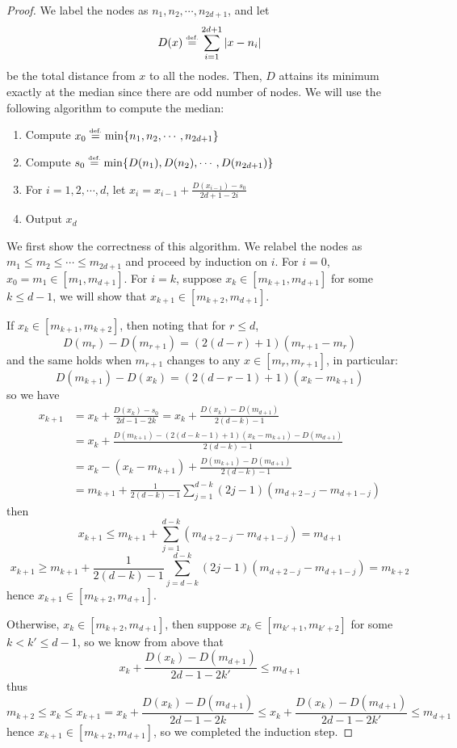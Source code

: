 \documentclass{article}
\numberwithin{equation}{section}
\theoremstyle{definition}
\newcommand{\eqdef}{\ensuremath{\stackrel{\mbox{\upshape\tiny def.}}{=}}}
\begin{document}
\begin{proof}
We label the nodes as $n_1,n_2,\cdots,n_{2d+1}$, and let 
$$D(x) \eqdef \sum_{i=1}^{2d+1} |x-n_i|$$
be the total distance from $x$ to all the nodes. Then, $D$ attains its minimum exactly at the median since there are odd number of nodes. We will use the following algorithm to compute the median:
\begin{enumerate}
    \item Compute $x_0 \eqdef \min\{n_1,n_2,\cdots,n_{2d+1}\}$
    \item Compute $s_0 \eqdef \min\{D(n_1),D(n_2),\cdots,D(n_{2d+1})\}$
    \item For $i=1,2,\cdots,d$, let $\displaystyle x_i=x_{i-1}+\frac{D(x_{i-1})-s_0}{2d+1-2i}$
    \item Output $x_d$
\end{enumerate}

We first show the correctness of this algorithm. We relabel the nodes as $m_1\le m_2\le\cdots\le m_{2d+1}$ and proceed by induction on $i$. For $i=0$, $x_0=m_1\in [m_1,m_{d+1}]$. For $i=k$, suppose $x_k\in [m_{k+1},m_{d+1}]$ for some $k\le d-1$, we will show that $x_{k+1}\in [m_{k+2},m_{d+1}]$.

If $x_k\in [m_{k+1},m_{k+2}]$, then noting that for $r\le d$, 
$$D(m_r)-D(m_{r+1})=(2(d-r)+1)(m_{r+1}-m_r)$$
and the same holds when $m_{r+1}$ changes to any $x\in [m_{r},m_{r+1}]$, in particular:
$$D(m_{k+1})-D(x_k)=(2(d-r-1)+1)(x_k-m_{k+1})$$
so we have
\begin{align*}
    x_{k+1} &= x_k+\frac{D(x_k)-s_0}{2d-1-2k} = x_k+\frac{D(x_k)-D(m_{d+1})}{2(d-k)-1} \\
    &= x_k+\frac{D(m_{k+1})-(2(d-k-1)+1)(x_k-m_{k+1})-D(m_{d+1})}{2(d-k)-1} \\
    &= x_k-(x_k-m_{k+1})+\frac{D(m_{k+1})-D(m_{d+1})}{2(d-k)-1} \\
    &= m_{k+1}+\frac{1}{2(d-k)-1} \sum_{j=1}^{d-k} (2j-1)(m_{d+2-j}-m_{d+1-j})
\end{align*}
then 
$$x_{k+1} \le m_{k+1} + \sum_{j=1}^{d-k} (m_{d+2-j}-m_{d+1-j}) = m_{d+1}$$
$$x_{k+1} \ge m_{k+1} + \frac{1}{2(d-k)-1} \sum_{j=d-k}^{d-k} (2j-1)(m_{d+2-j}-m_{d+1-j}) = m_{k+2}$$
hence $x_{k+1}\in [m_{k+2},m_{d+1}]$.

Otherwise, $x_k\in [m_{k+2},m_{d+1}]$, then suppose $x_k\in [m_{k'+1},m_{k'+2}]$ for some $k<k'\le d-1$, so we know from above that 
$$x_{k}+\frac{D(x_{k})-D(m_{d+1})}{2d-1-2k'} \le m_{d+1}$$
thus
$$m_{k+2} \le x_k \le x_{k+1} = x_{k}+\frac{D(x_{k})-D(m_{d+1})}{2d-1-2k} \le x_{k}+\frac{D(x_{k})-D(m_{d+1})}{2d-1-2k'} \le m_{d+1}$$
hence $x_{k+1}\in [m_{k+2},m_{d+1}]$, so we completed the induction step.


\end{proof}
\end{document}
